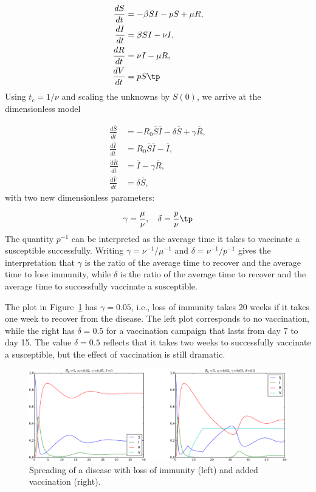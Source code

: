 \documentclass[graybox,envcountchap,sectrefs,final]{svmonodo}
\begin{document}
\begin{align}
\frac{dS}{dt} &= - \beta SI - pS + \mu R,
\label{scale:SIRV:S}\\ 
\frac{dI}{dt} &= \beta SI - \nu I,
\label{scale:SIRV:I}\\ 
\frac{dR}{dt} &= \nu I -\mu R,
\label{scale:SIRV:R}\\ 
\frac{dV}{dt} &= p S\tp
\label{scale:SIRV:V}
\end{align}
Using $t_c=1/\nu$ and scaling the unknowns by $S(0)$, we arrive at
the dimensionless model

\begin{align}
\frac{d\bar S}{d\bar t} &= - R_0 \bar S \bar I - \delta \bar S + \gamma \bar R,
\label{scale:SIRV:S2}\\ 
\frac{d\bar I}{d\bar t} &= R_0 \bar S \bar I - \bar I,
\label{scale:SIRV:I2}\\ 
\frac{d\bar R}{d\bar t} &= \bar I -\gamma \bar R,
\label{scale:SIRV:R2}\\ 
\frac{d\bar V}{d\bar t} &= \delta \bar S,
\label{scale:SIRV:V2}
\end{align}
with two new dimensionless parameters:

\[ \gamma = \frac{\mu}{\nu},\quad \delta = \frac{p}{\nu}\tp \]
The quantity $p^{-1}$ can be interpreted as the average time it takes
to vaccinate a susceptible successfully. Writing $\gamma = \nu^{-1}/\mu^{-1}$
and $\delta = \nu^{-1}/p^{-1}$ gives the interpretation that $\gamma$
is the ratio of the average time to recover and the average time to
lose immunity, while $\delta$ is the ratio of the average time to recover
and the average time to successfully vaccinate a susceptible.

The plot in Figure~\ref{sec:scale:SIRV:fig} has $\gamma = 0.05$, i.e.,
loss of immunity takes 20 weeks if it takes one week to recover from
the disease. The left plot corresponds to no vaccination, while the
right has $\delta = 0.5$ for a vaccination campaign that lasts from
day 7 to day 15. The value $\delta =0.5$ reflects that
it takes two weeks to successfully
vaccinate a susceptible, but the effect of vaccination is still dramatic.


\begin{figure}[!ht]  %
  \centerline{\includegraphics[width=1.0\linewidth]{fig-scaling/SIRV2.pdf}}
  \caption{
  Spreading of a disease with loss of immunity (left) and added vaccination (right). \label{sec:scale:SIRV:fig}
  }
\end{figure}
\end{document}
